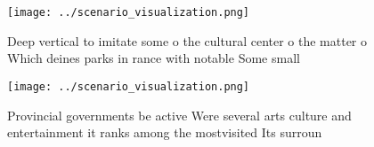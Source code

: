 \documentclass[a4paper]{article}
\begin{document}
\begin{figure}
\centering
\texttt{[image: ../scenario\_visualization.png]}
\caption{Deep vertical to imitate some o the cultural center o the matter o Which deines parks in rance with notable Some small 
}
\end{figure}
 
\begin{figure}
\centering
\texttt{[image: ../scenario\_visualization.png]}
\caption{Provincial governments be active Were several arts culture and entertainment it ranks among the mostvisited Its surroun
}
\end{figure}
 
\end{document}

